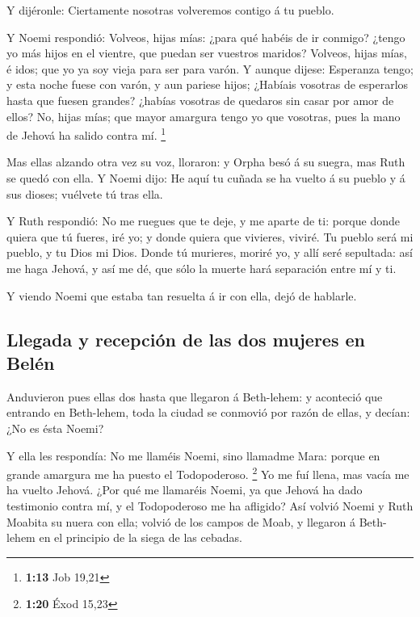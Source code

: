  Y dijéronle: Ciertamente nosotras volveremos contigo á
tu pueblo.

 Y Noemi respondió: Volveos, hijas mías: ¿para qué habéis
de ir conmigo? ¿tengo yo más hijos en el vientre, que puedan ser
vuestros maridos?  Volveos, hijas mías, é idos; que yo ya
soy vieja para ser para varón. Y aunque dijese: Esperanza tengo; y esta
noche fuese con varón, y aun pariese hijos;  ¿Habíais
vosotras de esperarlos hasta que fuesen grandes? ¿habías vosotras de
quedaros sin casar por amor de ellos? No, hijas mías; que mayor amargura
tengo yo que vosotras, pues la mano de Jehová ha salido contra mí.
\footnote{\textbf{1:13} Job 19,21}

 Mas ellas alzando otra vez su voz, lloraron: y Orpha
besó á su suegra, mas Ruth se quedó con ella.  Y Noemi
dijo: He aquí tu cuñada se ha vuelto á su pueblo y á sus dioses;
vuélvete tú tras ella.

 Y Ruth respondió: No me ruegues que te deje, y me aparte
de ti: porque donde quiera que tú fueres, iré yo; y donde quiera que
vivieres, viviré. Tu pueblo será mi pueblo, y tu Dios mi Dios.
 Donde tú murieres, moriré yo, y allí seré sepultada: así
me haga Jehová, y así me dé, que sólo la muerte hará separación entre mí
y ti.

 Y viendo Noemi que estaba tan resuelta á ir con ella,
dejó de hablarle.

\hypertarget{llegada-y-recepciuxf3n-de-las-dos-mujeres-en-beluxe9n}{%
\subsection{Llegada y recepción de las dos mujeres en
Belén}\label{llegada-y-recepciuxf3n-de-las-dos-mujeres-en-beluxe9n}}

 Anduvieron pues ellas dos hasta que llegaron á
Beth-lehem: y aconteció que entrando en Beth-lehem, toda la ciudad se
conmovió por razón de ellas, y decían: ¿No es ésta Noemi?

 Y ella les respondía: No me llaméis Noemi, sino llamadme
Mara: porque en grande amargura me ha puesto el Todopoderoso.
\footnote{\textbf{1:20} Éxod 15,23}  Yo me fuí llena, mas
vacía me ha vuelto Jehová. ¿Por qué me llamaréis Noemi, ya que Jehová ha
dado testimonio contra mí, y el Todopoderoso me ha afligido?
 Así volvió Noemi y Ruth Moabita su nuera con ella;
volvió de los campos de Moab, y llegaron á Beth-lehem en el principio de
la siega de las cebadas.

